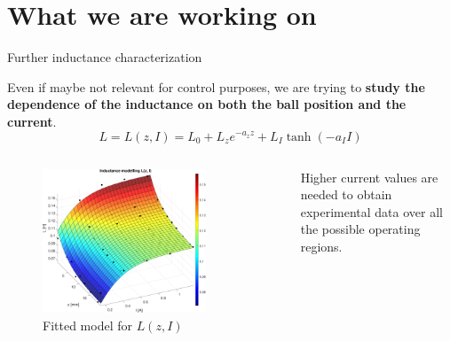 \section{What we are working on}

\begin{frame}{Further inductance characterization}

    Even if maybe not relevant for control purposes, we are trying to \textbf{study the dependence of the inductance on both the ball position and the current}.
    \begin{equation}
        L = L(z, I) = L_0 + L_z e^{-a_z z} + L_I \tanh(-a_I I)
    \end{equation}

    \begin{columns}[c, onlytextwidth]

        \begin{column}{0.65\textwidth}

            \begin{figure}
                \centering
                \includegraphics[width=0.8\textwidth]{img/MATLAB/measurements/inductance.pdf}
                \caption{Fitted model for $L(z, I)$}
            \end{figure}
        \end{column}

        \begin{column}{0.35\textwidth}

            Higher current values are needed to obtain experimental data over all the possible operating regions.

        \end{column}

    \end{columns}

\end{frame}



